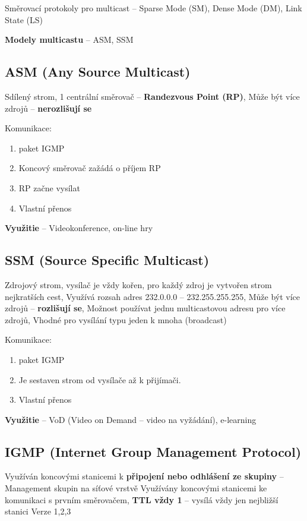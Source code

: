 Směrovací protokoly pro multicast -- Sparse Mode (SM), Dense Mode (DM), Link State (LS)

\textbf{Modely multicastu} -- ASM, SSM

\subsection{ASM (Any Source Multicast)}
Sdílený strom, 1 centrální směrovač – \textbf{Randezvous Point (RP)}, Může být více zdrojů – \textbf{nerozlišují se}

Komunikace: 
\begin{enumerate}
    \item paket IGMP
    \item Koncový směrovač zažádá o příjem RP
    \item RP začne vysílat
    \item Vlastní přenos
\end{enumerate}

\textbf{Využitie} -- Videokonference, on-line hry

\subsection{SSM (Source Specific Multicast)}
Zdrojový strom, vysílač je vždy kořen, pro každý zdroj je vytvořen strom nejkratších cest, Využívá rozsah adres 232.0.0.0 – 232.255.255.255, Může být více zdrojů – \textbf{rozlišují se}, Možnost používat jednu multicastovou adresu pro více zdrojů, Vhodné pro vysílání typu jeden k mnoha (broadcast)

Komunikace: 
\begin{enumerate}
    \item paket IGMP
    \item Je sestaven strom od vysílače až k přijímači.
    \item Vlastní přenos
\end{enumerate}

\textbf{Využitie} -- VoD (Video on Demand – video na vyžádání), e-learning

\subsection{IGMP (Internet Group Management Protocol)}
Využíván koncovými stanicemi k \textbf{připojení nebo odhlášení ze skupiny} -- Management skupin na síťové vrstvě\newline
Využívány koncovými stanicemi ke komunikaci s prvním směrovačem, \textbf{TTL vždy 1} -- vysílá vždy jen nejbližší stanici
Verze 1,2,3

